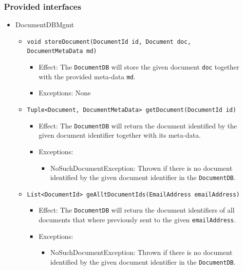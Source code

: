 \documentclass[a4paper,10pt]{article}
\begin{document}
\subsubsection*{Provided interfaces}
\begin{itemize}
    \item DocumentDBMgmt
    \begin{itemize}
        
		\item \texttt{void storeDocument(DocumentId id, Document doc, DocumentMetaData md)}
        \begin{itemize}
            \item Effect: The \texttt{DocumentDB} will store the given document \texttt{doc} together with the provided meta-data \texttt{md}.
            \item Exceptions:  None 
        \end{itemize}        

		\item \texttt{Tuple<Document, DocumentMetaData> getDocument(DocumentId id)}
        \begin{itemize}
            \item Effect: The \texttt{DocumentDB} will return the document identified by the given document identifier together with its meta-data.
            \item Exceptions:  
            \begin{itemize}
            	\item NoSuchDocumentException: Thrown if there is no document identified by the given document identifier in the \texttt{DocumentDB}.
            \end{itemize}
        \end{itemize}
        
		\item \texttt{List<DocumentId> geAlltDocumentIds(EmailAddress emailAddress)}
        \begin{itemize}
            \item Effect: The \texttt{DocumentDB} will return the document identifiers of all documents that where previously sent to the given \texttt{emailAddress}.
            \item Exceptions:  
            \begin{itemize}
            	\item NoSuchDocumentException: Thrown if there is no document identified by the given document identifier in the \texttt{DocumentDB}.
            \end{itemize}
        \end{itemize}        
        
    \end{itemize}
\end{itemize}
\end{document}
